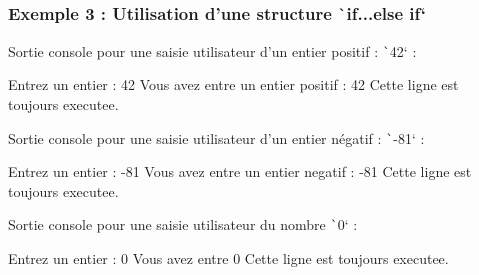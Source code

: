 \documentclass[10pt]{article}
\begin{document}
\subsubsection{Exemple 3 : Utilisation d'une structure \texttt`if...else if`}

\label{exempleStrucIfElseIf}

\bigskip
Sortie console pour une saisie utilisateur d'un entier positif : \texttt`42`  :

\begin{textcode}
    Entrez un entier : 42
    Vous avez entre un entier positif : 42
    Cette ligne est toujours executee.
\end{textcode}

Sortie console pour une saisie utilisateur d'un entier négatif : \texttt`-81`  :

\begin{textcode}
    Entrez un entier : -81
    Vous avez entre un entier negatif : -81
    Cette ligne est toujours executee.
\end{textcode}

Sortie console pour une saisie utilisateur du nombre \texttt`0` :

\begin{textcode}
    Entrez un entier : 0
    Vous avez entre 0
    Cette ligne est toujours executee.
\end{textcode}
\end{document}
